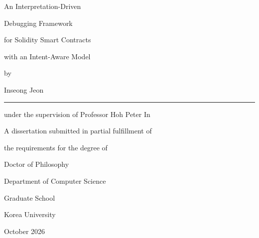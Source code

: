 \documentclass[11pt,oneside]{report}
\theoremstyle{plain}
\theoremstyle{definition}
\theoremstyle{remark}
\begin{document}
\newpage
\begin{center}
{\fontsize{21pt}{25pt}\selectfont
An Interpretation-Driven \par
Debugging Framework \par
for Solidity Smart Contracts \par
with an Intent-Aware Model \par}   %
\par\vspace{1.8cm}
{\fontsize{16pt}{16pt}\selectfont by \par Inseong Jeon \par}
\vspace{0.8cm}
\rule{.6\textwidth}{0.4pt}          %
\par\vspace{0.2cm}
{\fontsize{16pt}{18pt}\selectfont under the supervision of Professor Hoh Peter In \par
\vspace{0.5cm}
A dissertation submitted in partial fulfillment of \par
the requirements for the degree of \par
Doctor of Philosophy \par}
\vspace{10pt}
{\fontsize{16pt}{16pt}\selectfont Department of Computer Science \par}
\vspace{1.5cm}
{\fontsize{18pt}{18pt}\selectfont Graduate School \par\vspace{0.5cm}
Korea University \par}
\vspace{1cm}
{\fontsize{14pt}{14pt}\selectfont October 2026}   %
\end{center}
\end{document}

